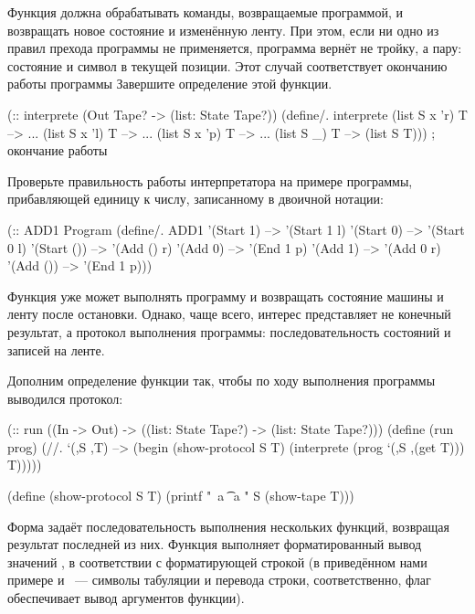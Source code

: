 \begin{Assignment}
  Функция  должна обрабатывать команды, возвращаемые программой, и возвращать новое состояние и изменённую ленту. При этом, если ни одно из правил прехода программы не применяется, программа вернёт не тройку, а пару: состояние и символ в текущей позиции. Этот случай соответствует окончанию работы программы
Завершите определение этой функции.
\begin{SchemeCode}[emph={S,T,v}]
(:: interprete (Out Tape? -> (list: State Tape?))
  (define/. interprete
    (list S x 'r) T --> ...
    (list S x 'l) T --> ...
    (list S x 'p) T --> ...
    (list S _) T --> (list S T))) ; окончание работы
\end{SchemeCode}

Проверьте правильность работы интерпретатора на примере программы, прибавляющей единицу к числу, записанному в двоичной нотации:
\begin{SchemeCode}
(:: ADD1 Program
  (define/. ADD1
    '(Start 1) --> '(Start 1 l) 
    '(Start 0) --> '(Start 0 l) 
    '(Start ()) --> '(Add () r) 
    '(Add 0) --> '(End 1 p) 
    '(Add 1) --> '(Add 0 r) 
    '(Add ()) --> '(End 1 p)))
\end{SchemeCode}
\end{Assignment}

Функция  уже может выполнять программу и возвращать состояние машины и ленту после остановки. Однако, чаще всего, интерес представляет не конечный результат, а протокол выполнения программы: последовательность состояний и записей на ленте.

Дополним определение функции  так, чтобы по ходу выполнения программы выводился протокол:
\begin{Definition}[emph={S,T,prog}]
(:: run ((In -> Out) -> ((list: State Tape?) -> 
                         (list: State Tape?)))
 (define (run prog)
   (//. `(,S ,T) --> (begin
                       (show-protocol S T)
                       (interprete (prog `(,S ,(get T))) T)))))%

(define (show-protocol S T)
  (printf "~a \t ~a \n" S (show-tape T)))
\end{Definition}

Форма  задаёт последовательность выполнения нескольких функций, возвращая результат последней из них. Функция  выполняет форматированный вывод значений , в соответствии с форматирующей строкой  (в приведённом нами примере  и ~--- символы табуляции и перевода строки, соответственно, флаг  обеспечивает вывод аргументов функции).

